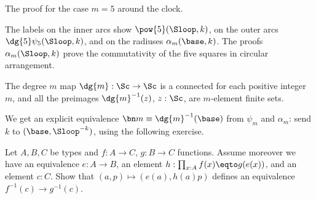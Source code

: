 \begin{marginfigure}
  \caption{The proof for the case $m=5$ around the clock.}
  \label{fig:psi-alpha-5-clock}
\end{marginfigure}
The labels on the inner arcs show $\pow{5}(\Sloop,k)$, on the
outer arcs $\dg{5}\psi_5(\Sloop,k)$, and on the radiuses
$\alpha_m(\base,k)$. The proofs $\alpha_m(\Sloop,k)$ prove
the commutativity of the five squares in circular arrangement.


\begin{corollary}\label{cor:dgm-conncov}
  The degree $m$ map $\dg{m}:\Sc\to\Sc$ is a connected \covering for
  each positive integer $m$, and all the preimages
  $\dg{m}^{-1}(z)$, $z:\Sc$, are $m$-element finite sets.
\end{corollary}
We get an explicit equivalence $\bn m \equiv \dg{m}^{-1}(\base)$ from $\psi_m$
and $\alpha_m$: send $k$ to $(\base,\Sloop^{-k})$, using the following exercise.

\begin{xca}\label{xca:preim-eq}
  Let $A,B,C$ be types and $f:A\to C$, $g:B\to C$ functions.
  Assume moreover we have an equivalence $e: A\to B$,
  an element $h: \prod_{x:A} f(x)\eqto g(e(x))$, and an element $c:C$.
  Show that $(a,p)\mapsto (e(a),h(a)p)$
  defines an equivalence $f^{-1}(c)\to g^{-1}(c)$.
\end{xca}

